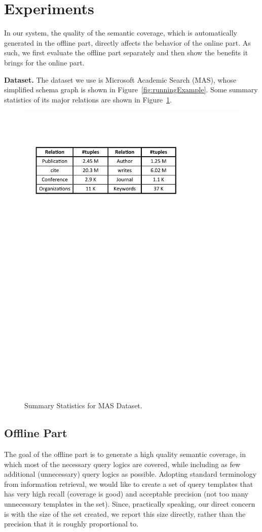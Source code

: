 \documentclass{vldb}
\begin{document}
\section{Experiments}
\label{sec:experiments}

In our system, the quality of the semantic coverage, which is automatically generated in the offline part, directly affects the behavior of the online part.  As such, we first evaluate the offline part separately and then show the benefits it brings for the online part.  

\textbf{Dataset.}
The dataset we use is Microsoft Academic Search (MAS), whose simplified schema graph is shown in Figure~\ref{fig:runningExample}.  Some summary statistics of its major relations are shown in Figure~\ref{fig:statistics}.  

\begin{figure}
  \center
  \includegraphics[width=0.8\linewidth]{pic/statistics.pdf}
  \caption{Summary Statistics for MAS Dataset.}
  \label{fig:statistics}
\end{figure}

\subsection{Offline Part}
\label{subsec:experiments_offline}
The goal of the offline part is to generate a high quality semantic coverage, in which most of the necessary query logics are covered, while including as few additional (unnecessary) query logics as possible.  Adopting standard terminology from information retrieval, we would like to create a set of query templates that has very high recall (coverage is good) and acceptable precision (not too many unnecessary templates in the set).  Since, practically speaking, our direct concern is with the size of the set created, we report this size directly, rather than the precision that it is roughly proportional to.  
\end{document}
